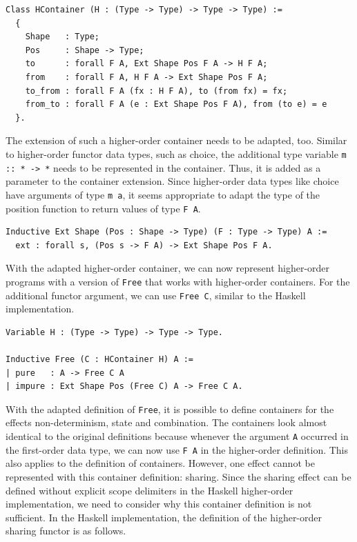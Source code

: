 \documentclass[a4paper, 11pt, fleqn, twoside]{scrreprt}
\newcommand{\hinl}[1]{\texttt{#1}}
\newcommand{\cinl}[1]{\texttt{#1}}
\begin{document}
\begin{verbatim}
Class HContainer (H : (Type -> Type) -> Type -> Type) :=
  {
    Shape   : Type;
    Pos     : Shape -> Type;
    to      : forall F A, Ext Shape Pos F A -> H F A;
    from    : forall F A, H F A -> Ext Shape Pos F A;
    to_from : forall F A (fx : H F A), to (from fx) = fx;
    from_to : forall F A (e : Ext Shape Pos F A), from (to e) = e
  }.
\end{verbatim}

The extension of such a higher-order container needs to be adapted, too.
Similar to higher-order functor data types, such as choice, the additional type variable \hinl{m :: * -> *} needs to be represented in the container.
Thus, it is added as a parameter to the container extension.
Since higher-order data types like choice have arguments of type \hinl{m a}, it seems appropriate to adapt the type of the position function to return values of type \cinl{F A}.

\begin{verbatim}
Inductive Ext Shape (Pos : Shape -> Type) (F : Type -> Type) A := 
  ext : forall s, (Pos s -> F A) -> Ext Shape Pos F A.
\end{verbatim}

With the adapted higher-order container, we can now represent higher-order programs with a version of \cinl{Free} that works with higher-order containers.
For the additional functor argument, we can use \cinl{Free C}, similar to the Haskell implementation.

\begin{verbatim}
Variable H : (Type -> Type) -> Type -> Type.

Inductive Free (C : HContainer H) A :=
| pure   : A -> Free C A
| impure : Ext Shape Pos (Free C) A -> Free C A.
\end{verbatim}

With the adapted definition of \cinl{Free}, it is possible to define containers for the effects non-determinism, state and combination.
The containers look almost identical to the original definitions because whenever the argument \cinl{A} occurred in the first-order data type, we can now use \cinl{F A} in the higher-order definition.
This also applies to the definition of containers.
However, one effect cannot be represented with this container definition: sharing.
Since the sharing effect can be defined without explicit scope delimiters in the Haskell higher-order implementation, we need to consider why this container definition is not sufficient.
In the Haskell implementation, the definition of the higher-order sharing functor is as follows.
\end{document}
